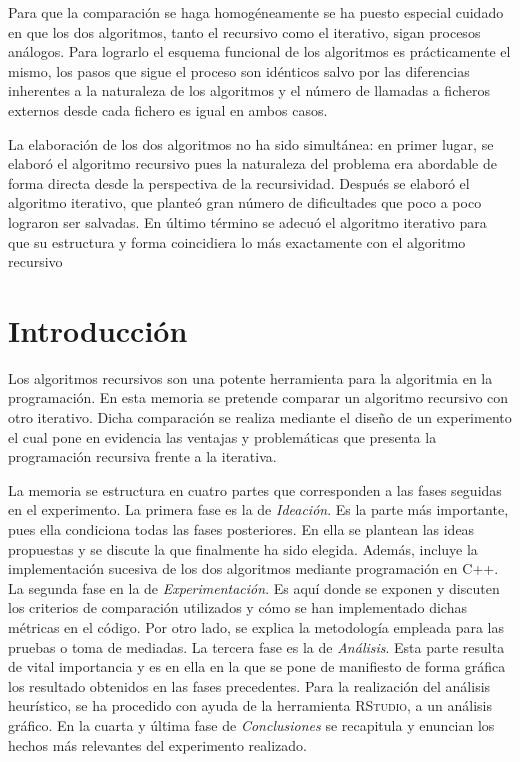 \documentclass[12pt,a4paper]{article}
\begin{document}
Para que la comparación se haga homogéneamente se ha puesto especial cuidado en que los dos algoritmos, tanto el recursivo como el iterativo, sigan procesos análogos. Para lograrlo el esquema funcional de los algoritmos es prácticamente el mismo, los pasos que sigue el proceso son idénticos salvo por las diferencias inherentes a la naturaleza de los algoritmos y el número de llamadas a ficheros externos desde cada fichero es igual en ambos casos. 

La elaboración de los dos algoritmos no ha sido simultánea: en primer lugar, se elaboró el algoritmo recursivo pues la naturaleza del problema era abordable de forma directa desde la perspectiva de la recursividad. Después se elaboró el algoritmo iterativo, que planteó gran número de dificultades que poco a poco lograron ser salvadas. En último término se adecuó el algoritmo iterativo para que su estructura y forma coincidiera lo más exactamente con el algoritmo recursivo
{
 \hypersetup{linkcolor=black}%
 
 \tableofcontents
}

\clearpage



\section*{Introducción}
Los algoritmos recursivos son una potente herramienta para la algoritmia en la programación. En esta memoria se pretende comparar un algoritmo recursivo con otro iterativo. Dicha comparación se realiza mediante el diseño de un experimento el cual pone en evidencia las ventajas y problemáticas que presenta la programación recursiva frente a la iterativa.

La memoria se estructura en cuatro partes que corresponden a las fases seguidas en el experimento.
La primera fase es la de \textit{Ideación}. Es la parte más importante, pues ella condiciona todas las fases posteriores. En ella se plantean las ideas propuestas y se discute la que finalmente ha sido elegida. Además, incluye la implementación sucesiva de los dos algoritmos mediante programación en C++.
La segunda fase en la de \textit{Experimentación}. Es aquí donde se exponen y discuten los criterios de comparación utilizados y cómo se han implementado dichas métricas en el código. Por otro lado, se explica la metodología empleada para las pruebas o toma de mediadas.
La tercera fase es la de \textit{Análisis}. Esta parte resulta de vital importancia y es en ella en la que se pone de manifiesto de forma gráfica los resultado obtenidos en las fases precedentes. Para la realización del análisis heurístico, se ha procedido con ayuda de la herramienta \textsc{RStudio}, a un análisis gráfico.
En la cuarta y última fase de \textit{Conclusiones} se recapitula y enuncian los hechos más relevantes del experimento realizado.
\end{document}
